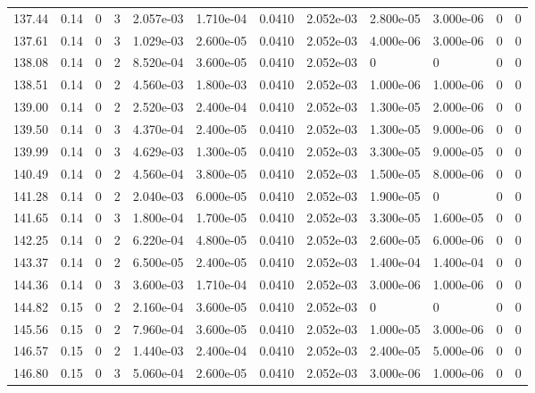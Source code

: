 \documentclass[preview]{standalone}
\begin{document}
{{{{{{{\begin{tabular}{L{1.2cm}C{1.2cm} C{0.3cm}C{0.5cm} C{1.4cm}C{1.4cm} C{1.4cm}C{1.4cm} C{1.6cm}C{1.6cm} C{1.6cm}C{1.6cm}}
  137.44  &  0.14  & 0     &  3 &  2.057e-03  & 1.710e-04  &  0.0410&   2.052e-03& 2.800e-05 & 3.000e-06   &  0 & 0  \\ 
  137.61  &  0.14  & 0     &  3 &  1.029e-03  & 2.600e-05  &  0.0410&   2.052e-03& 4.000e-06 & 3.000e-06   &  0 & 0  \\ 
  138.08  &  0.14  & 0     &  2 &  8.520e-04  & 3.600e-05  &  0.0410&   2.052e-03& 0 & 0   &  0 & 0  \\ 
  138.51  &  0.14  & 0     &  2 &  4.560e-03  & 1.800e-03  &  0.0410&   2.052e-03& 1.000e-06 & 1.000e-06   &  0 & 0  \\ 
  139.00  &  0.14  & 0     &  2 &  2.520e-03  & 2.400e-04  &  0.0410&   2.052e-03& 1.300e-05 & 2.000e-06   &  0 & 0  \\ 
  139.50  &  0.14  & 0     &  3 &  4.370e-04  & 2.400e-05  &  0.0410&   2.052e-03& 1.300e-05 & 9.000e-06   &  0 & 0  \\ 
  139.99  &  0.14  & 0     &  3 &  4.629e-03  & 1.300e-05  &  0.0410&   2.052e-03& 3.300e-05 & 9.000e-05   &  0 & 0  \\ 
  140.49  &  0.14  & 0     &  2 &  4.560e-04  & 3.800e-05  &  0.0410&   2.052e-03& 1.500e-05 & 8.000e-06   &  0 & 0  \\ 
  141.28  &  0.14  & 0     &  2 &  2.040e-03  & 6.000e-05  &  0.0410&   2.052e-03& 1.900e-05 & 0   &  0 & 0  \\ 
  141.65  &  0.14  & 0     &  3 &  1.800e-04  & 1.700e-05  &  0.0410&   2.052e-03& 3.300e-05 & 1.600e-05   &  0 & 0  \\ 
  142.25  &  0.14  & 0     &  2 &  6.220e-04  & 4.800e-05  &  0.0410&   2.052e-03& 2.600e-05 & 6.000e-06   &  0 & 0  \\ 
  143.37  &  0.14  & 0     &  2 &  6.500e-05  & 2.400e-05  &  0.0410&   2.052e-03& 1.400e-04 & 1.400e-04   &  0 & 0  \\ 
  144.36  &  0.14  & 0     &  3 &  3.600e-03  & 1.710e-04  &  0.0410&   2.052e-03& 3.000e-06 & 1.000e-06   &  0 & 0  \\ 
  144.82  &  0.15  & 0     &  2 &  2.160e-04  & 3.600e-05  &  0.0410&   2.052e-03& 0 & 0   &  0 & 0  \\ 
  145.56  &  0.15  & 0     &  2 &  7.960e-04  & 3.600e-05  &  0.0410&   2.052e-03& 1.000e-05 & 3.000e-06   &  0 & 0  \\ 
  146.57  &  0.15  & 0     &  2 &  1.440e-03  & 2.400e-04  &  0.0410&   2.052e-03& 2.400e-05 & 5.000e-06   &  0 & 0  \\ 
  146.80  &  0.15  & 0     &  3 &  5.060e-04  & 2.600e-05  &  0.0410&   2.052e-03& 3.000e-06 & 1.000e-06   &  0 & 0  \\ 

\end{tabular}}}}}}}}
\end{document}
